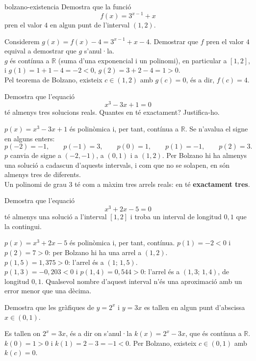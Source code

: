 \begin{apartats}

\begin{tria}{bolzano-existencia}
Demostra que la funció
\[
f(x)=3^{x-1}+x
\]
pren el valor $4$ en algun punt de l'interval $(1,2)$.

\begin{solucio}
Considerem $g(x)=f(x)-4=3^{x-1}+x-4$. Demostrar que $f$ pren el valor $4$ equival a
demostrar que $g$ s'anul·la.\\
$g$ és contínua a $\mathbb{R}$ (suma d'una exponencial i un polinomi), en particular a
$[1,2]$, i $g(1)=1+1-4=-2<0$, $g(2)=3+2-4=1>0$.\\
Pel teorema de Bolzano, existeix $c\in(1,2)$ amb $g(c)=0$, és a dir, $f(c)=4$.
\end{solucio}

Demostra que l'equació
\[
x^3-3x+1=0
\]
té almenys tres solucions reals. Quantes en té exactament? Justifica-ho.

\begin{solucio}
$p(x)=x^3-3x+1$ és polinòmica i, per tant, contínua a $\mathbb{R}$. Se n'avalua el signe en
alguns enters:
\[
p(-2)=-1,\qquad p(-1)=3,\qquad p(0)=1,\qquad p(1)=-1,\qquad p(2)=3 .
\]
$p$ canvia de signe a $(-2,-1)$, a $(0,1)$ i a $(1,2)$. Per Bolzano hi ha almenys una solució
a cadascun d'aquests intervals, i com que no se solapen, en són almenys tres de diferents.\\
Un polinomi de grau $3$ té com a màxim tres arrels reals: en té \textbf{exactament tres}.
\end{solucio}
\end{tria}

\begin{nomesllarg}
Demostra que l'equació
\[
x^3+2x-5=0
\]
té almenys una solució a l'interval $[1,2]$ i troba un interval de longitud $0{,}1$ que la
contingui.

\begin{solucio}
$p(x)=x^3+2x-5$ és polinòmica i, per tant, contínua. $p(1)=-2<0$ i $p(2)=7>0$: per
Bolzano hi ha una arrel a $(1,2)$.\\
$p(1{,}5)=1{,}375>0$: l'arrel és a $(1;\,1{,}5)$.\\
$p(1{,}3)=-0{,}203<0$ i $p(1{,}4)=0{,}544>0$: l'arrel és a $(1{,}3;\,1{,}4)$, de
longitud $0{,}1$. Qualsevol nombre d'aquest interval n'és una aproximació amb un error
menor que una dècima.
\end{solucio}
\end{nomesllarg}

Demostra que les gràfiques de $y=2^{x}$ i $y=3x$ es tallen en algun punt d'abscissa
$x\in(0,1)$.

\begin{solucio}
Es tallen on $2^x=3x$, és a dir on s'anul·la $k(x)=2^x-3x$, que és contínua a
$\mathbb{R}$. $k(0)=1>0$ i $k(1)=2-3=-1<0$. Per Bolzano, existeix $c\in(0,1)$ amb
$k(c)=0$.
\end{solucio}

\end{apartats}
